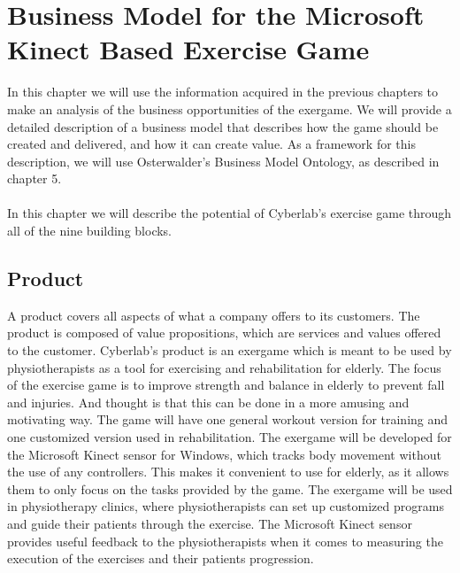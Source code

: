 \chapter{Business Model for the Microsoft Kinect Based Exercise Game}
In this chapter we will use the information acquired in the previous chapters to  make an analysis of the business opportunities of the exergame. We will provide a detailed description of a business model that describes how the game should be created and delivered, and how it can create value. As a framework for this description, we will use Osterwalder's Business Model Ontology, as described in chapter 5. \\ \\ 
In this chapter we will describe the potential of Cyberlab's exercise game through all of the nine building blocks.  

\section{Product}
A product covers all aspects of what a company offers to its customers. The product is composed of value propositions, which are services and values offered to the customer. Cyberlab’s product is an exergame which is meant to be used by physiotherapists as a tool for exercising and rehabilitation for elderly. The focus of the exercise game is to improve strength and balance in elderly to prevent fall and injuries. And thought is that this can be done in a more amusing and motivating way. The game will have one general workout version for training and one customized version used in rehabilitation. The exergame will be developed for the Microsoft Kinect sensor for Windows, which tracks body movement without the use of any controllers. This makes it convenient to use for elderly, as it allows them to only focus on the tasks provided by the game. The exergame will be used in physiotherapy clinics, where physiotherapists can set up customized programs and guide their patients through the exercise. The Microsoft Kinect sensor provides useful feedback to the physiotherapists when it comes to measuring the execution of the exercises and their patients progression. 
